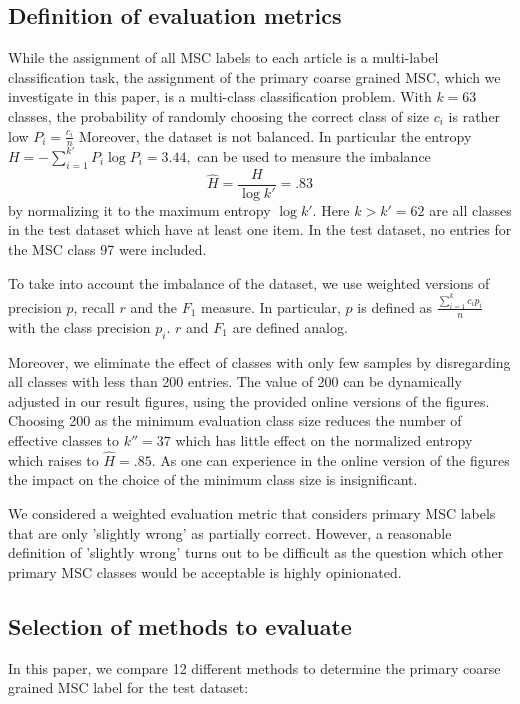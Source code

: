 \subsection{Definition of evaluation metrics}
While the assignment of all MSC labels to each article is a multi-label classification task, the assignment of the primary coarse grained MSC, which we investigate in this paper, is a multi-class classification problem.
With $k=63$ classes, the probability of randomly choosing the correct class of size $c_i$ is rather low
\(
P_i=\frac{c_i}{n}
\)
Moreover, the dataset is not balanced. In particular the entropy \(
H=-\sum_{i=1}^{k'}P_i\log P_i=3.44,
\)
can be used to measure the imbalance \[
\hat{H}=\frac{H}{\log k'}=.83
\]
by normalizing it to the maximum entropy $\log k'.$
Here $k>k'=62$ are all classes in the test dataset which have at least one item. 
In the test dataset, no entries for the MSC class 97 were included.

To take into account the imbalance of the dataset, we use weighted versions of precision $p$, recall $r$ and the $F_1$ measure. In particular, $p$ is defined as \(
\frac{\sum_{i=1}^{k}c_ip_i}{n}
\) with the class precision $p_i$.
$r$ and $F_1$ are defined analog.

Moreover, we eliminate the effect of classes with only few samples by disregarding all classes with less than 200 entries.
The value of 200 can be dynamically adjusted in our result figures, using the provided online versions of the figures.
Choosing 200 as the minimum evaluation class size reduces the number of effective classes to $k''=37$ which has little effect on the normalized entropy which raises to $\hat{H}=.85.$
As one can experience in the online version of the figures the impact on the choice of the minimum class size is insignificant.

We considered a weighted evaluation metric that considers primary MSC labels that are only 'slightly wrong' as partially correct.
However, a reasonable definition of 'slightly wrong' turns out to be difficult as the question which other primary MSC classes would be acceptable is highly opinionated.
\subsection{Selection of methods to evaluate}


In this paper, we compare 12 different methods to determine the primary coarse grained MSC label for the test dataset:

